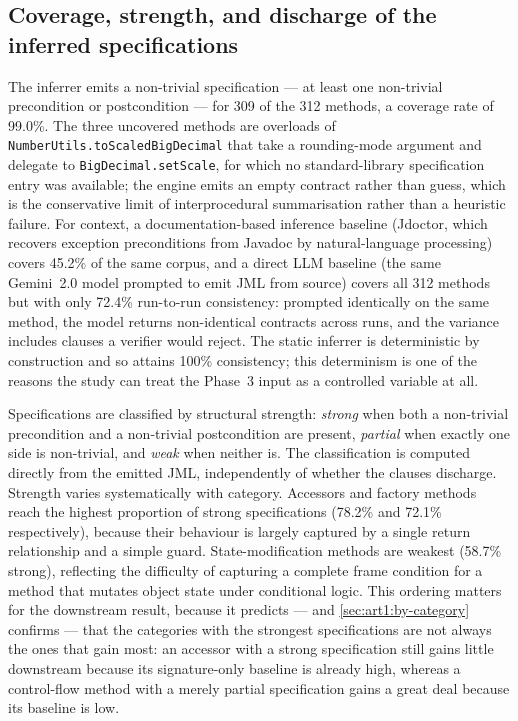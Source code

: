 \subsection{Coverage, strength, and discharge of the inferred specifications}
\label{sec:art1:spec-quality}

The inferrer emits a non-trivial specification --- at least one non-trivial
precondition or postcondition --- for 309 of the 312 methods, a coverage rate of
99.0\%. The three uncovered methods are overloads of
\texttt{NumberUtils.toScaledBigDecimal} that take a rounding-mode argument and
delegate to \texttt{BigDecimal.setScale}, for which no standard-library
specification entry was available; the engine emits an empty contract rather than
guess, which is the conservative limit of interprocedural summarisation rather
than a heuristic failure. For context, a documentation-based inference baseline
(Jdoctor, which recovers exception preconditions from Javadoc by natural-language
processing) covers 45.2\% of the same corpus, and a direct LLM baseline (the same
Gemini~2.0 model prompted to emit JML from source) covers all 312 methods but with
only 72.4\% run-to-run consistency: prompted identically on the same method, the
model returns non-identical contracts across runs, and the variance includes
clauses a verifier would reject. The static inferrer is deterministic by
construction and so attains 100\% consistency; this determinism is one of the
reasons the study can treat the Phase~3 input as a controlled variable at all.

Specifications are classified by structural strength: \emph{strong} when both a
non-trivial precondition and a non-trivial postcondition are present,
\emph{partial} when exactly one side is non-trivial, and \emph{weak} when neither
is. The classification is computed directly from the emitted JML, independently of
whether the clauses discharge. Strength varies systematically with category.
Accessors and factory methods reach the highest proportion of strong
specifications (78.2\% and 72.1\% respectively), because their behaviour is largely
captured by a single return relationship and a simple guard. State-modification
methods are weakest (58.7\% strong), reflecting the difficulty of capturing a
complete frame condition for a method that mutates object state under conditional
logic. This ordering matters for the downstream result, because it predicts ---
and \cref{sec:art1:by-category} confirms --- that the categories with the strongest
specifications are not always the ones that gain most: an accessor with a strong
specification still gains little downstream because its signature-only baseline is
already high, whereas a control-flow method with a merely partial specification
gains a great deal because its baseline is low.

